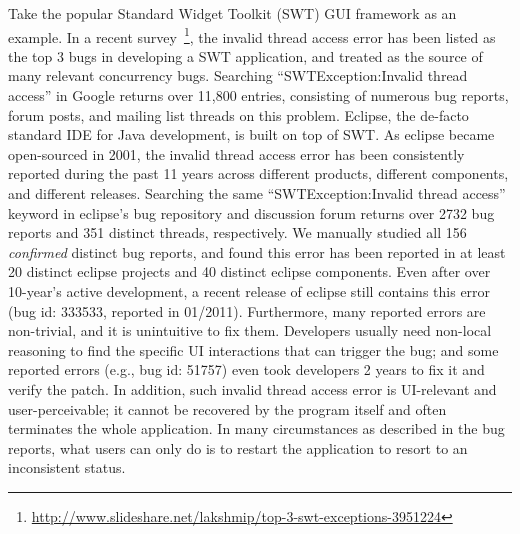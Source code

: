 Take the popular Standard Widget Toolkit (SWT) GUI framework as an example. 
In a recent survey~\footnote{\url{http://www.slideshare.net/lakshmip/top-3-swt-exceptions-3951224}}, the invalid thread access error
has been listed as the top 3 bugs in developing a SWT application, and treated
as the source of many relevant concurrency bugs. Searching
``SWTException:Invalid thread access'' in Google returns over 11,800 entries,
consisting of numerous bug reports, forum posts, and mailing list threads on
this problem. Eclipse, the de-facto standard IDE for Java development,
is built on top of SWT. As eclipse became open-sourced in 2001, the invalid thread access error has
been consistently reported during the past 11 years across different products, different components, and different releases.
Searching the same ``SWTException:Invalid thread access'' keyword in eclipse's bug repository
and discussion forum returns over 2732 bug reports and 351 distinct threads, respectively. 
We manually studied all 156 \textit{confirmed} distinct bug reports, and 
found this error has been reported in at least 20 distinct eclipse projects
and 40 distinct eclipse components. Even after over 10-year's active development,
a recent release of eclipse still contains this error (bug id: 333533, reported in 01/2011).
 Furthermore, many reported  errors are non-trivial, and it is unintuitive
to fix them. Developers usually
need non-local reasoning to find the specific UI interactions that can trigger the bug; and
some reported errors (e.g., bug id: 51757) even took developers 2 years to fix it and verify the
patch. In addition, such invalid thread access error is UI-relevant and user-perceivable;
it cannot be recovered by the program itself and often terminates the whole application.
In many circumstances as described in the bug reports,
what users can only do is to restart the application to resort to an inconsistent status.





